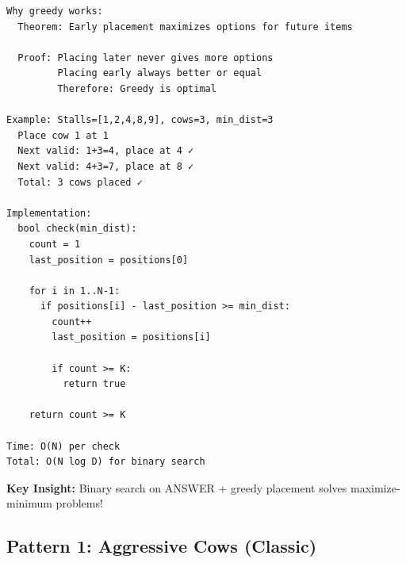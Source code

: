 \documentclass[11pt,a4paper,oneside]{book}
\begin{document}
\begin{tcolorbox}[
    enhanced,breakable,
    colback=white,
    colframe=deepblue,
    boxrule=1.5pt,
    arc=3mm,
    title=\textbf{The Maximize-Minimum Paradigm}
]
\begin{verbatim}
Why greedy works:
  Theorem: Early placement maximizes options for future items
  
  Proof: Placing later never gives more options
         Placing early always better or equal
         Therefore: Greedy is optimal

Example: Stalls=[1,2,4,8,9], cows=3, min_dist=3
  Place cow 1 at 1
  Next valid: 1+3=4, place at 4 ✓
  Next valid: 4+3=7, place at 8 ✓
  Total: 3 cows placed ✓

Implementation:
  bool check(min_dist):
    count = 1
    last_position = positions[0]
    
    for i in 1..N-1:
      if positions[i] - last_position >= min_dist:
        count++
        last_position = positions[i]
        
        if count >= K:
          return true
    
    return count >= K

Time: O(N) per check
Total: O(N log D) for binary search
\end{verbatim}

\textbf{Key Insight:}
Binary search on ANSWER + greedy placement solves maximize-minimum problems!
\end{tcolorbox}

\subsection{Pattern 1: Aggressive Cows (Classic)}
\end{document}
